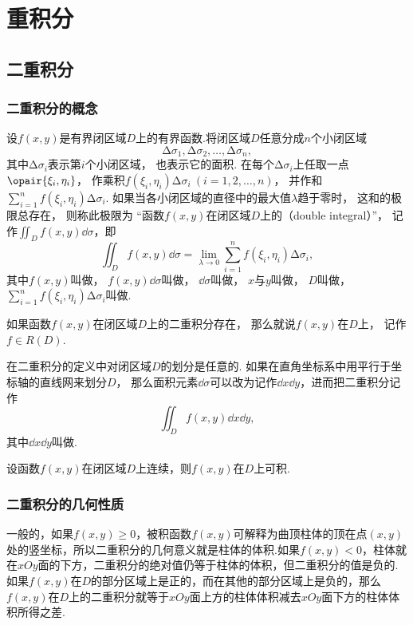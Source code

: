 \chapter{重积分}
\section{二重积分}
\subsection{二重积分的概念}
设\(f(x,y)\)是有界闭区域\(D\)上的有界函数.将闭区域\(D\)任意分成\(n\)个小闭区域\[
\increment\sigma_1,\increment\sigma_2,\dotsc,\increment\sigma_n,
\]其中\(\increment\sigma_i\)表示第\(i\)个小闭区域，
也表示它的面积.
在每个\(\increment\sigma_i\)上任取一点\(\opair{\xi_i,\eta_i}\)，
作乘积\(f(\xi_i,\eta_i) \increment\sigma_i\ (i=1,2,\dotsc,n)\)，
并作和\(\sum\limits_{i=1}^n f(\xi_i,\eta_i) \increment\sigma_i\).
如果当各小闭区域的直径中的最大值\(\lambda\)趋于零时，
这和的极限总存在，
则称此极限为
“函数\(f(x,y)\)在闭区域\(D\)上的（double integral）”，
记作\(\iint_D f(x,y) \dd{\sigma}\)，即
\[
	\iint_D f(x,y) \dd{\sigma}
	= \lim\limits_{\lambda\to0}
	\sum\limits_{i=1}^n f(\xi_i,\eta_i) \increment\sigma_i,
\]
其中\(f(x,y)\)叫做，
\(f(x,y) \dd{\sigma}\)叫做，
\(\dd{\sigma}\)叫做，
\(x\)与\(y\)叫做，
\(D\)叫做，
\(\sum\limits_{i=1}^n f(\xi_i,\eta_i) \increment\sigma_i\)叫做.

如果函数\(f(x,y)\)在闭区域\(D\)上的二重积分存在，
那么就说\(f(x,y)\)在\(D\)上，
记作\(f \in R(D)\).

在二重积分的定义中对闭区域\(D\)的划分是任意的.
如果在直角坐标系中用平行于坐标轴的直线网来划分\(D\)，
那么面积元素\(\dd{\sigma}\)可以改为记作\(\dd{x}\dd{y}\)，进而把二重积分记作\[
\iint_{D}{f(x,y)\dd{x}\dd{y}},
\]其中\(\dd{x}\dd{y}\)叫做.

\begin{theorem}[充分条件]
设函数\(f(x,y)\)在闭区域\(D\)上连续，则\(f(x,y)\)在\(D\)上可积.
\end{theorem}

\subsection{二重积分的几何性质}
一般的，如果\(f(x,y) \geq 0\)，被积函数\(f(x,y)\)可解释为曲顶柱体的顶在点\((x,y)\)处的竖坐标，所以二重积分的几何意义就是柱体的体积.如果\(f(x,y) < 0\)，柱体就在\(xOy\)面的下方，二重积分的绝对值仍等于柱体的体积，但二重积分的值是负的.如果\(f(x,y)\)在\(D\)的部分区域上是正的，而在其他的部分区域上是负的，那么\(f(x,y)\)在\(D\)上的二重积分就等于\(xOy\)面上方的柱体体积减去\(xOy\)面下方的柱体体积所得之差.

